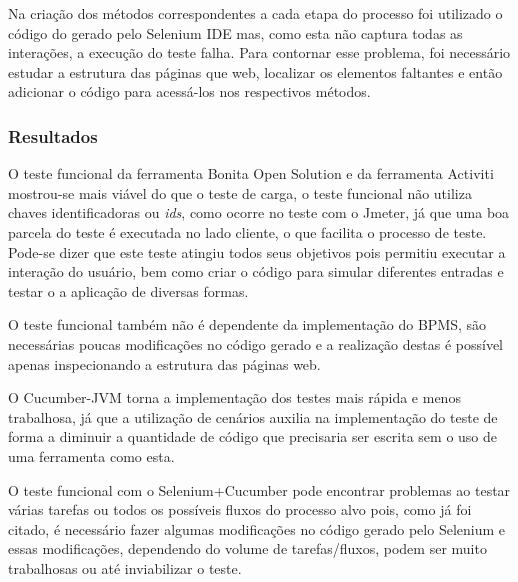 \documentclass[12pt]{article}
\begin{document}
Na criação dos métodos correspondentes a cada etapa do processo foi utilizado o código do gerado pelo Selenium IDE mas, como esta não captura todas as interações, a execução do teste falha. Para contornar esse problema, foi necessário estudar a estrutura das páginas que web, localizar os elementos faltantes e então adicionar o código para acessá-los nos respectivos métodos.

\subsubsection{Resultados}

O teste funcional da ferramenta Bonita Open Solution e da ferramenta Activiti mostrou-se mais viável do que o teste de carga, o teste funcional não utiliza chaves identificadoras ou \emph{ids}, como ocorre no teste com o Jmeter, já que uma boa parcela do teste é executada no lado cliente, o que facilita o processo de teste. Pode-se dizer que este teste atingiu todos seus objetivos pois permitiu executar a interação do usuário, bem como criar o código para simular diferentes entradas e testar o a aplicação de diversas formas.

O teste funcional também não é dependente da implementação do BPMS, são necessárias poucas modificações no código gerado e a realização destas é possível apenas inspecionando a estrutura das páginas web.

O Cucumber-JVM torna a implementação dos testes mais rápida e menos trabalhosa, já que a utilização de cenários auxilia na implementação do teste de forma a diminuir a quantidade de código que precisaria ser escrita sem o uso de uma ferramenta como esta.

O teste funcional com o Selenium+Cucumber pode encontrar problemas ao testar várias tarefas ou todos os possíveis fluxos do processo alvo pois, como já foi citado, é necessário fazer algumas modificações no código gerado pelo Selenium e essas modificações, dependendo do volume de tarefas/fluxos, podem ser muito trabalhosas ou até inviabilizar o teste.


\end{document}
